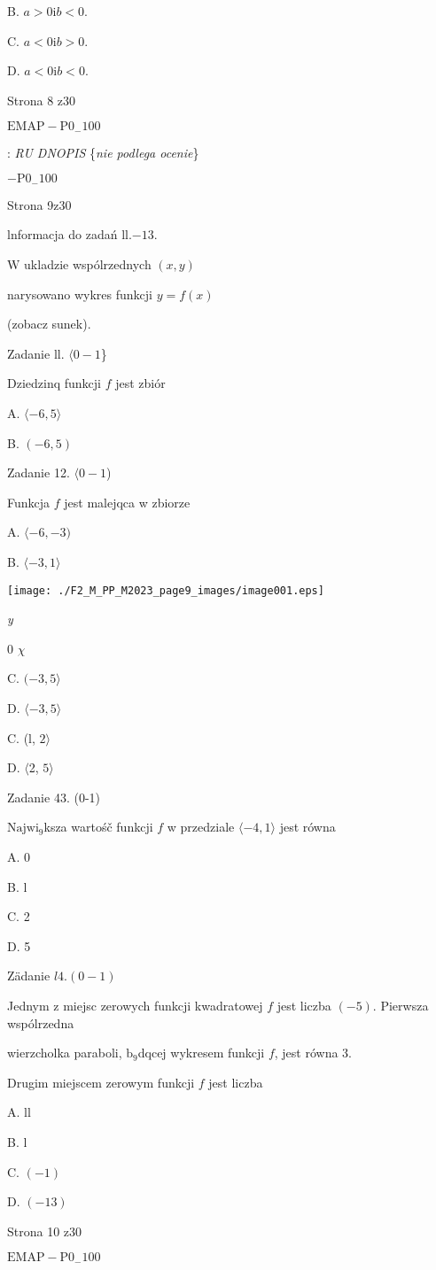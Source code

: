 \documentclass[a4paper,12pt]{article}
\begin{document}
B. $a>0 \mathrm{i} b<0.$

C. $a<0 \mathrm{i} b>0.$

D. $a<0 \mathrm{i} b<0.$

Strona 8 z30

$\mathrm{E}\mathrm{M}\mathrm{A}\mathrm{P}-\mathrm{P}0_{-}100$





: {\it RU DNOPIS} \{{\it nie podlega ocenie}\}

$-\mathrm{P}0_{-}100$

Strona 9z30





lnformacja do zadań ll.$-13.$

$\mathrm{W}$ ukladzie wspólrzednych $(x,y)$

narysowano wykres funkcji $y=f(x)$

(zobacz sunek).

Zadanie ll. $\langle 0-1$\}

Dziedzinq funkcji $f$ jest zbiór

A. $\langle-6,  5\rangle$

B. $(-6,5)$

Zadanie 12. $\langle 0-1$)

Funkcja $f$ jest malejqca w zbiorze

A. $\langle-6, -3)$

B. $\langle-3,1\rangle$
\begin{center}
\texttt{[image: ./F2\_M\_PP\_M2023\_page9\_images/image001.eps]}
\end{center}
{\it y}

0  $\chi$

C. $(-3,5\rangle$

D. $\langle-3,  5\rangle$

C. (l, $ 2\rangle$

D. $\langle$2, $ 5\rangle$

Zadanie 43. (0-1)

$\mathrm{N}\mathrm{a}\mathrm{j}\mathrm{w}\mathrm{i}_{9}$ksza wartośč funkcji $f$ w przedziale $\langle-4,  1\rangle$ jest równa

A. 0

B. l

C. 2

D. 5

Zädanie $l4. (0-1)$

Jednym z miejsc zerowych funkcji kwadratowej $f$ jest liczba $(-5)$. Pierwsza wspólrzedna

wierzcholka paraboli, $\mathrm{b}_{9}$dqcej wykresem funkcji $f$, jest równa 3.

Drugim miejscem zerowym funkcji $f$ jest liczba

A. ll

B. l

C. $(-1)$

D. $(-13)$

Strona 10 z30

$\mathrm{E}\mathrm{M}\mathrm{A}\mathrm{P}-\mathrm{P}0_{-}100$
\end{document}
